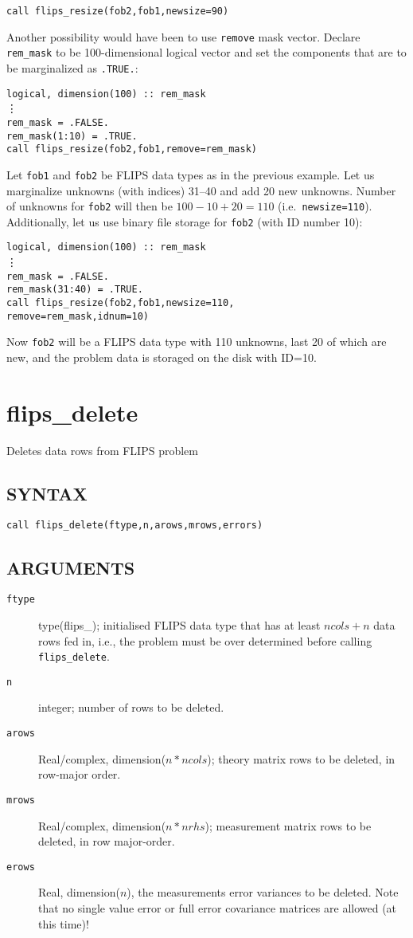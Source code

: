 \documentclass[a4paper,twoside]{refrep}
\newcommand{\code}[1]{{\tt #1}}
\newcommand{\aitem}[1]{\item[{\tt #1}]}
\newenvironment{arglist}
	{\begin{description}}
	{\end{description}}
\begin{document}
\code{call flips\_resize(fob2,fob1,newsize=90)}

Another possibility would have been to use \code{remove} mask vector. Declare \code{rem\_mask} to be 100-dimensional logical vector and set the components that are to be marginalized as \code{.TRUE.}:

\code{logical, dimension(100) :: rem\_mask}\\
\vdots\\
\code{rem\_mask = .FALSE.}\\
\code{rem\_mask(1:10) = .TRUE.}\\
\code{call flips\_resize(fob2,fob1,remove=rem\_mask)}

 Let \code{fob1} and \code{fob2} be FLIPS data types as in the previous example. Let us marginalize unknowns (with indices) 31--40 and add 20 new unknowns. Number of unknowns for \code{fob2} will then be $100-10+20 = 110$ (i.e.\ \code{newsize=110}). Additionally, let us use binary file storage for \code{fob2} (with ID number 10):

\code{logical, dimension(100) :: rem\_mask}\\
\vdots\\
\code{rem\_mask = .FALSE.}\\
\code{rem\_mask(31:40) = .TRUE.}\\
\code{call flips\_resize(fob2,fob1,newsize=110,}\\
\code{\phantom{call flips\_resize(}remove=rem\_mask,idnum=10)}

Now \code{fob2} will be a FLIPS data type with 110 unknowns, last 20 of which are new, and the problem data is storaged on the disk with ID=10.




\newpage
\section{flips\_delete}
Deletes data rows from FLIPS problem

\subsection*{SYNTAX}
\code{call flips\_delete(ftype,n,arows,mrows,errors)}

\subsection*{ARGUMENTS}
\begin{arglist}
\aitem{ftype} type(flips\_<s|d|c|z>); initialised FLIPS data type that has at least $ncols + n$ data rows fed in, i.e., the problem must be over determined before calling \verb!flips_delete!.
\aitem{n} integer; number of rows to be deleted.
\aitem{arows} Real/complex, dimension($n*ncols$); theory matrix rows to be deleted, in row-major order.
\aitem{mrows} Real/complex, dimension($n*nrhs$); measurement matrix rows to be deleted, in row major-order.
\aitem{erows} Real, dimension($n$), the measurements error variances to be deleted. Note that no single value error or full error covariance matrices are allowed (at this time)!
\end{arglist}
\end{document}
